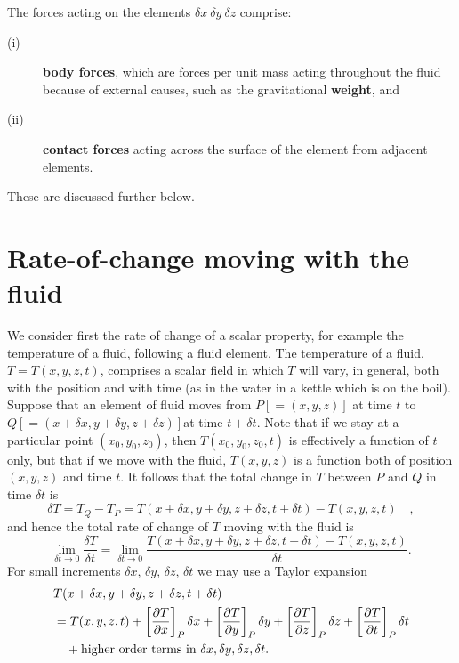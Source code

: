 \documentclass[twoside,a4paper,11pt]{report}
\begin{document}
The forces acting on the elements $\delta x\ \delta y\ \delta z$ comprise:
\begin{description}
\item[(i)] \textbf{body forces}, which are forces per unit mass acting throughout 
the fluid because of external causes, such as the gravitational 
\textbf{weight}, and
\item[(ii)] \textbf{contact forces} acting across the surface of the element from 
adjacent elements.
\end{description}
These are discussed further below.

\section{Rate-of-change moving with the fluid}
We consider first the rate of change of a scalar property, for example the 
temperature of a fluid, following a fluid element. The temperature of a 
fluid, $T = T(x,y,z,t)$, comprises a scalar field in which $T$ will vary, in 
general, both with the position and with time (as in the water in a kettle 
which is on the boil). Suppose that an element of fluid moves from 
$P[=(x,y,z)]$ at time $t$ to $Q[=(x+\delta 
x,y+\delta y,z+\delta z)]$at time $ t + \delta t$. 
Note that if we stay at a particular point $(x_{0},y_{0},z_{0})$, then 
$T(x_{0},y_{0},z_{0},t)$ is effectively a function of $t$ only, but that 
if we move with the fluid, $T(x,y,z)$ is a function both of position $(x,y,z)$ 
and time $t$. It follows that the total change in $T$ between $P$ and $Q$ in time 
$\delta t$ is
\[
\delta T=T_Q -T_P =T(x+\delta 
x,y+\delta y,z+\delta z,t+\delta 
t)-T(x,y,z,t)\quad ,
\]
and hence the total rate of change of $T$ moving with the fluid is
\[
\mathop {\lim }\limits_{\delta t\to 0} \frac{\delta T}{\delta 
t}=\mathop {\lim }\limits_{\delta t\to 0} 
\frac{T(x+\delta x,y+\delta 
y,z+\delta z,t+\delta 
t)-T(x,y,z,t)}{\delta t}.
\]
For small increments $\delta x$, $\delta y$, $\delta z$, $\delta t$ we may 
use a Taylor expansion
\begin{align*}
&T(x+\delta x,y+\delta y,z+\delta 
z,t+\delta t) \\
& =T(x,y,z,t)+\left[ 
{\frac{\partial T}{\partial x}} \right]_P \delta x+
\left[ {\frac{\partial T}{\partial y}} \right]_P \delta y+\left[ 
{\frac{\partial T}{\partial z}} \right]_P \delta z+\left[ 
{\frac{\partial T}{\partial t}} \right]_P \delta t \\
& \quad + 
\hbox{higher order terms in }\delta 
x,\delta y,\delta z,\delta t. 
\end{align*}
\end{document}
